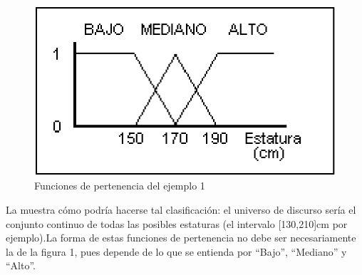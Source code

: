 \begin{figure}[H]
	\centering
	\includegraphics[scale=0.3]{images/fuzzy_example.png}
	\caption{Funciones de pertenencia del ejemplo 1}
	\label{fig:ej1}
\end{figure}
La  muestra cómo podría hacerse tal clasificación: el universo de
discurso sería el conjunto continuo de todas las posibles estaturas (el
intervalo [130,210]cm por ejemplo).La forma de
estas funciones de pertenencia no debe ser necesariamente la de la figura 1,
pues depende de lo que se entienda por ``Bajo'', ``Mediano'' y ``Alto''.

